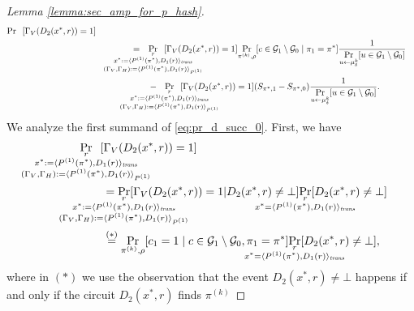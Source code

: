 \begin{proof}[Lemma \ref{lemma:sec_amp_for_p_hash}]
\begin{align}
{\Pr}\mkern13mu[\Gamma_V(D_2(x^*, r)) = 1] \notag\\
%
&\IndII = \mkern13mu
  \underset{
    \mathclap{
      \substack{r \\ x^* := \langle P^{(1)}(\pi^*), D_1 (r) \rangle_{\mathit{trans}} \\ (\Gamma_V, \Gamma_H) := \langle P^{(1)}(\pi^*), D_1 (r) \rangle_{P^{(1)}} }}}
  {\Pr}\mkern13mu[\Gamma_V(D_2(x^*, r)) = 1]
  \underset{\pi^{(k)},\rho}{\Pr}[c \in \cG_1 \setminus \cG_0 \mid \pi_1 = \pi^*]
\frac{1}{\underset{u \leftarrow \mu_{\delta}^k}{\Pr}[ u \in \cG_1 \setminus \cG_0]}\notag\\
%
&\IndIII - \mkern13mu
\underset{
  \mathclap{
  \substack{r \\ x^* := \langle P^{(1)}(\pi^*), D_1(r) \rangle_{\mathit{trans}} \\ (\Gamma_V, \Gamma_H) := \langle P^{(1)}(\pi^*), D_1(r) \rangle_{P^{(1)}} }}}
{\Pr}\mkern13mu[\Gamma_V(D_2(x^*, r)) = 1](S_{\pi^*,1} - S_{\pi^*,0})
\frac{1}{\underset{u \leftarrow \mu_{\delta}^k}{\Pr}[ u \in \cG_1 \setminus\cG_0]}.
\end{align}
We analyze the first summand of \eqref{eq:pr_d_succ_0}. First, we have
\begin{align}
  \label{eq:pr_gamma_v_0}
  \IndII &\underset{
    \mathclap{
      \substack{r \\
        x^* := \langle P^{(1)}(\pi^*), D_1 (r) \rangle_{\mathit{trans}} \\
        (\Gamma_V, \Gamma_H) := \langle P^{(1)}(\pi^*), D_1(r) \rangle_{P^{(1)}} }}}
  {\Pr}\mkern13mu[\Gamma_V(D_2(x^*, r)) = 1] \notag\\
  &\IndI = \underset{
    \mathclap{
      \substack{r \\
        x^* := \langle P^{(1)}(\pi^*), D_1 (r) \rangle_{\mathit{trans}} \\
        (\Gamma_V, \Gamma_H) := \langle P^{(1)}(\pi^*), D_1(r) \rangle_{P^{(1)}} }}}
  {\Pr}[\Gamma_V(D_2(x^*, r)) = 1 | D_2(x^*,r) \neq \bot]
  \underset{\mathclap{\substack{r \\ x^* = \langle P^{(1)}(\pi^*), D_1(r) \rangle_{\mathit{trans}}}}}{\Pr}[D_2(x^*,r) \neq \bot] \notag\\
  &\IndI \stackrel{(*)}{=}
  \underset{\pi^{(k)}, \rho}{\Pr}[c_1 = 1 \mid c \in \cG_1 \setminus \cG_0, \pi_1 = \pi^*]
  \underset{\mathclap{\substack{r \\ x^* = \langle P^{(1)}(\pi^*), D_1(r) \rangle_{\mathit{trans}}}}} {\Pr}[D_2(x^*,r) \neq \bot],
\end{align}
where in $(*)$ we use the observation that the event $D_2(x^*, r) \neq \bot$ happens if and only if the circuit $D_2(x^*, r)$ finds $\pi^{(k)}$

\end{proof}
